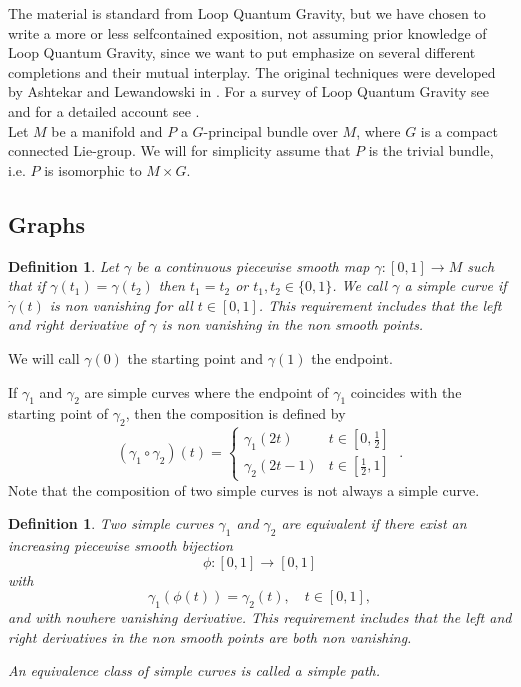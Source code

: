 \documentclass[12pt]{article}
\newtheorem{definition}[thm]{Definition}
\begin{document}
The material is standard from Loop Quantum Gravity, but we have chosen to write a more or less selfcontained exposition, not assuming prior knowledge of Loop Quantum Gravity, since we want to put emphasize on several different completions and their mutual interplay.  The original techniques were developed by Ashtekar and Lewandowski in \cite{AL2}. For a survey of Loop Quantum Gravity see \cite{AL1} and for a detailed account see \cite{Th1}.\\

Let $M$ be a manifold and $P$ a $G$-principal bundle over $M$, where $G$ is a compact connected Lie-group. We will for simplicity assume that $P$ is the trivial bundle, i.e. $P$ is isomorphic to $M\times G$.

\subsection{Graphs}
\begin{definition}\label{curve}
Let $\gamma$ be  a  continuous piecewise smooth map $\gamma:[0,1]\to M$ such that if $\gamma (t_1)=\gamma(t_2)$ then $t_1=t_2$ or $t_1,t_2\in \{ 0,1 \}$. We call $\gamma$ a simple curve if $\dot{\gamma}(t)$ is non vanishing for all $t\in [ 0,1]$. This requirement includes that the left and right derivative of $\gamma$ is non vanishing in the non smooth points. 
\end{definition}

We will call $\gamma (0)$ the starting point and $\gamma (1)$ the endpoint.

If $\gamma_1$ and $\gamma_2$ are simple curves where the endpoint of $\gamma_1$ coincides with the starting point of $\gamma_2$, then the composition is defined by
$$(\gamma_1\circ \gamma_2) (t)=\left\{ 
\begin{array}{cl} 
\gamma_1(2t)& t\in [0,\frac{1}{2}]\\
\gamma_2(2t-1) & t\in [\frac{1}{2},1]
\end{array}\;.
\right.$$
 Note that the composition of two simple curves is not always a simple curve.


\begin{definition}\label{path}
Two simple curves $\gamma_1$ and $\gamma_2$ are equivalent if there exist an increasing piecewise smooth bijection
$$\phi :[0,1]\to [0,1]$$
with 
$$\gamma_1 (\phi (t))=\gamma_2(t), \quad t \in [0,1],$$
and with nowhere vanishing derivative. This requirement includes that the left and right derivatives in the non smooth points are both non vanishing. 

An equivalence class of simple curves is called a simple path.
\end{definition}
\end{document}
